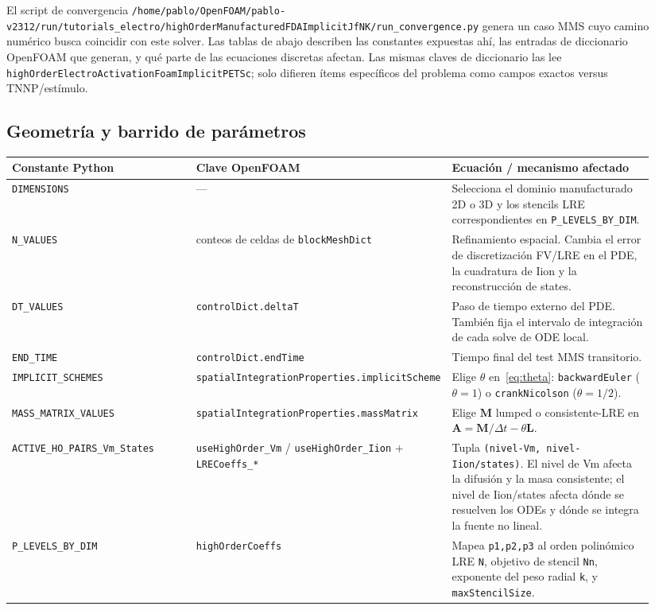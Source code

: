 \documentclass[11pt,a4paper]{article}
\newcommand{\code}[1]{\texttt{\small #1}}
\newcommand{\Mmass}{\mathbf{M}}
\newcommand{\Lop}{\mathbf{L}}
\newcommand{\Aimp}{\mathbf{A}}
\begin{document}
El script de convergencia
\code{/home/pablo/OpenFOAM/pablo-v2312/run/tutorials\_electro/highOrderManufacturedFDAImplicitJfNK/run\_convergence.py}
genera un caso MMS cuyo camino numérico busca coincidir con este solver. Las tablas
de abajo describen las constantes expuestas ahí, las entradas de diccionario OpenFOAM
que generan, y qué parte de las ecuaciones discretas afectan. Las mismas claves de
diccionario las lee \code{highOrderElectroActivationFoamImplicitPETSc}; solo difieren
ítems específicos del problema como campos exactos versus TNNP/estímulo.

\subsection{Geometría y barrido de parámetros}
\begin{longtable}{@{}p{0.30\linewidth}p{0.28\linewidth}p{0.36\linewidth}@{}}
\toprule
Constante Python & Clave OpenFOAM & Ecuación / mecanismo afectado \\
\midrule \endhead
\code{DIMENSIONS} & --- &
   Selecciona el dominio manufacturado 2D o 3D y los stencils LRE
   correspondientes en \code{P\_LEVELS\_BY\_DIM}. \\
\code{N\_VALUES} & conteos de celdas de \code{blockMeshDict} &
   Refinamiento espacial. Cambia el error de discretización FV/LRE en el
   PDE, la cuadratura de Iion y la reconstrucción de states. \\
\code{DT\_VALUES} & \code{controlDict.deltaT} &
   Paso de tiempo externo del PDE. También fija el intervalo de integración de cada
   solve de ODE local. \\
\code{END\_TIME} & \code{controlDict.endTime} &
   Tiempo final del test MMS transitorio. \\
\code{IMPLICIT\_SCHEMES} &
   \code{spatialIntegrationProperties.implicitScheme} &
   Elige $\theta$ en~\eqref{eq:theta}: \code{backwardEuler}
   ($\theta=1$) o \code{crankNicolson} ($\theta=1/2$). \\
\code{MASS\_MATRIX\_VALUES} &
   \code{spatialIntegrationProperties.massMatrix} &
   Elige $\Mmass$ lumped o consistente-LRE en
   $\Aimp=\Mmass/\Delta t-\theta\Lop$. \\
\code{ACTIVE\_HO\_PAIRS\_Vm\_States} &
   \code{useHighOrder\_Vm} / \code{useHighOrder\_Iion}
   + \code{LRECoeffs\_*} &
   Tupla \code{(nivel-Vm, nivel-Iion/states)}. El nivel de Vm afecta la
   difusión y la masa consistente; el nivel de Iion/states afecta dónde se
   resuelven los ODEs y dónde se integra la fuente no lineal. \\
\code{P\_LEVELS\_BY\_DIM} & \code{highOrderCoeffs} &
   Mapea \code{p1,p2,p3} al orden polinómico LRE \code{N}, objetivo de stencil
   \code{Nn}, exponente del peso radial \code{k}, y
   \code{maxStencilSize}. \\
\bottomrule
\end{longtable}
\end{document}
